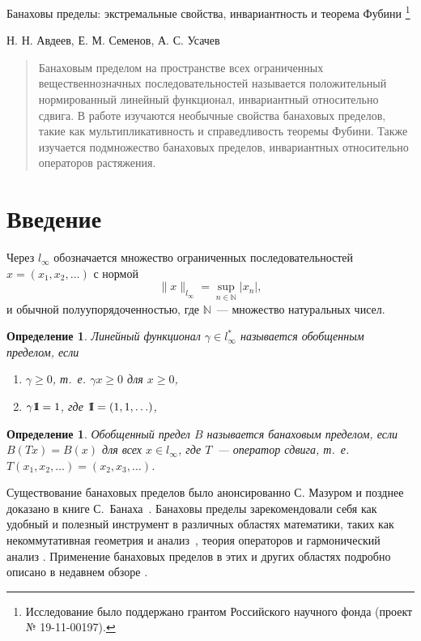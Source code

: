 \documentclass[12pt]{article}
\newcommand{\emm}{\mathrm{1\hspace{-0.3em} I}}
\newtheorem{dfn}[thm]{Определение}
\begin{document}
\begin{center}
{
	\Large Банаховы пределы: экстремальные свойства, инвариантность и теорема Фубини
	\footnote{
		Исследование было поддержано грантом Российского научного фонда (проект № 19-11-00197).

	}
}

Н. Н. Авдеев, Е. М. Семенов, А. С. Усачев
\end{center}

\begin{abstract}
Банаховым пределом на пространстве всех ограниченных вещественнозначных последовательностей называется положительный нормированный линейный функционал, инвариантный относительно сдвига. В работе изучаются необычные свойства банаховых пределов, такие как мультипликативность и справедливость теоремы Фубини. Также изучается подмножество банаховых пределов, инвариантных относительно операторов растяжения.
\end{abstract}


\section{Введение}


Через $l_\infty$ обозначается множество ограниченных
последовательностей $x=(x_1,x_2,\ldots)$ с нормой
\[
 \|x\|_{l_\infty}=\sup_{n\in \mathbb N}|x_n|,
\]
 и обычной полуупорядоченностью, где ${\mathbb N}$~--- множество натуральных чисел.

\begin{dfn}
Линейный функционал $\gamma\in l_\infty^*$ называется обобщенным пределом,
если
\begin{enumerate}
    \item $\gamma\geq0$, т.~е. $\gamma x \geq 0$ для $x \geq 0$,
    \item $\gamma\emm=1$, где $\emm =(1,1,\ldots)$,
\end{enumerate}
\end{dfn}

\begin{dfn}
	Обобщенный предел $B$ называется банаховым пределом,
	если $B(Tx)=B(x)$ для всех $x\in l_\infty$, где $T$~---
    оператор сдвига, т.~е. $T(x_1,x_2,\ldots)=(x_2,x_3,\ldots)$.
\end{dfn}

Существование банаховых пределов было анонсированно С. Мазуром \cite{Mazur} и позднее доказано в книге С.~Банаха~\cite{B}.
Банаховы пределы зарекомендовали себя как удобный и полезный инструмент в различных областях математики, таких как некоммутативная геометрия и анализ~\cite{CS}, теория операторов \cite{Sem_Sht} и гармонический анализ \cite{Ast_Sem, SU, U2}. Применение банаховых пределов в этих и других областях подробно описано в недавнем обзоре \cite{SSU_survey}.
\end{document}
